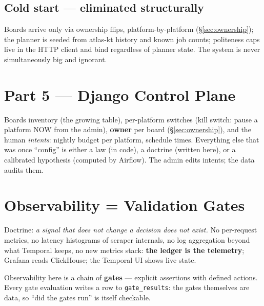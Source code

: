 \documentclass[11pt,a4paper]{article}
\begin{document}
\subsection{Cold start --- eliminated structurally}
Boards arrive only via ownership flips, platform-by-platform (\S\ref{sec:ownership}); the planner is seeded
from atlas-kt history and known job counts; politeness caps live in the HTTP client and bind regardless of
planner state. The system is never simultaneously big and ignorant.

\section{Part 5 --- Django Control Plane}
Boards inventory (the growing table), per-platform switches (kill switch: pause a platform NOW from the
admin), \textbf{owner} per board (\S\ref{sec:ownership}), and the human \emph{intents}: nightly budget per
platform, schedule times. Everything else that was once ``config'' is either a law (in code), a doctrine
(written here), or a calibrated hypothesis (computed by Airflow). The admin edits intents; the data audits
them.

\section{Observability = Validation Gates}
\label{sec:gates}

Doctrine: \emph{a signal that does not change a decision does not exist.} No per-request metrics, no
latency histograms of scraper internals, no log aggregation beyond what Temporal keeps, no new metrics
stack: \textbf{the ledger is the telemetry}; Grafana reads ClickHouse; the Temporal UI shows live state.

Observability here is a chain of \textbf{gates} --- explicit assertions with defined actions. Every gate
evaluation writes a row to \texttt{gate\_results}: the gates themselves are data, so ``did the gates run''
is itself checkable.
\end{document}

